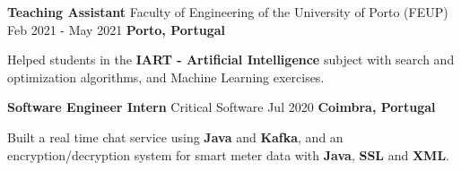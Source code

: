 \begin{cventries}
  \cventry
     {\textbf{Teaching Assistant}} %
    {Faculty of Engineering of the University of Porto (FEUP) \href{https://sigarra.up.pt/feup/pt/web_page.inicial}{\faExternalLink}} %
    {Feb 2021 - May 2021} %
    {\textbf{Porto, Portugal}} %
    {
      \begin{cvitems} %
        \item {Helped students in the \textbf{IART - Artificial Intelligence} subject with search and optimization algorithms, and Machine Learning exercises.}
      \end{cvitems}
    }


  \cventry
    {\textbf{Software Engineer Intern}} %
    {Critical Software \href{https://www.criticalsoftware.com/en}{\faExternalLink}} %
    {Jul 2020} %
    {\textbf{Coimbra, Portugal}} %
    {
      \begin{cvitems} %
        \item {Built a real time chat service using \textbf{Java} and \textbf{Kafka}, and an encryption/decryption system for smart meter data with \textbf{Java}, \textbf{SSL} and \textbf{XML}.}
      \end{cvitems}
    }




\end{cventries}
